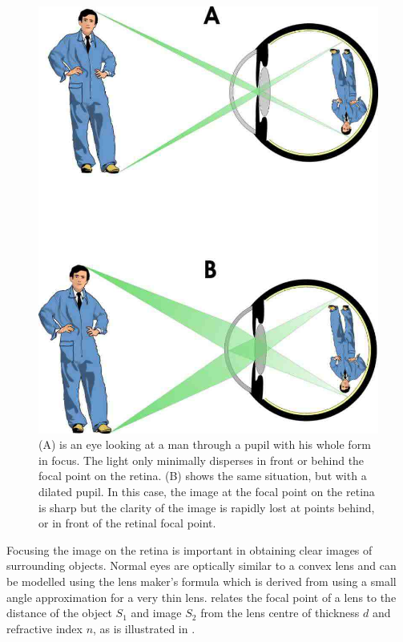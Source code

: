 \begin{figure}[H]
\centering
  \includegraphics{figures/light_path}
\caption{(A) is an eye looking at a man through a pupil with his whole form in focus.
		The light only minimally disperses in front or behind the focal point
		on the retina. (B) shows the same situation, but with a dilated pupil.
		In this case, the image at the focal point on the retina is sharp but
		the clarity of the image is rapidly lost at points behind, or in front
		of the retinal focal point.\cite{adrian1927action}}
\label{fig:light_journey}
\end{figure}

Focusing the image on the retina is important in obtaining clear images of
surrounding objects. Normal eyes are optically similar to a convex lens
and can be modelled using the lens maker's formula 
which is derived from  using a small angle approximation
for a very thin lens. relates the focal point of a lens to
the distance of the object $S_1$ and image $S_2$ from the lens centre of
thickness $d$ and refractive index $n$, as is illustrated in
.\cite{greivenkamp2004field}

